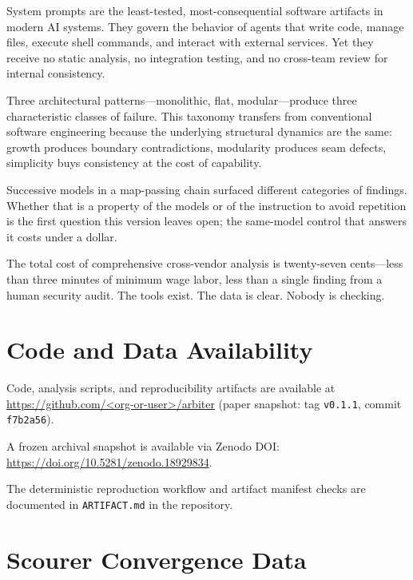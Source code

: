 \documentclass[11pt,a4paper]{article}
\begin{document}
System prompts are the least-tested, most-consequential software
artifacts in modern AI systems. They govern the behavior of agents that
write code, manage files, execute shell commands, and interact with
external services. Yet they receive no static analysis, no integration
testing, and no cross-team review for internal consistency.

Three architectural patterns---monolithic, flat, modular---produce
three characteristic classes of failure. This taxonomy transfers from
conventional software engineering because the underlying structural
dynamics are the same: growth produces boundary contradictions,
modularity produces seam defects, simplicity buys consistency at the
cost of capability.

Successive models in a map-passing chain surfaced different categories
of findings. Whether that is a property of the models or of the
instruction to avoid repetition is the first question this version
leaves open; the same-model control that answers it costs under a
dollar.

The total cost of comprehensive cross-vendor analysis is twenty-seven
cents---less than three minutes of minimum wage labor, less than a
single finding from a human security audit. The tools exist. The data
is clear. Nobody is checking.


\section{Code and Data Availability}
\label{sec:availability}

Code, analysis scripts, and reproducibility artifacts are available at
\url{https://github.com/<org-or-user>/arbiter} (paper snapshot:
tag \texttt{v0.1.1}, commit \texttt{f7b2a56}).

A frozen archival snapshot is available via Zenodo DOI:
\url{https://doi.org/10.5281/zenodo.18929834}.

The deterministic reproduction workflow and artifact manifest checks are
documented in \texttt{ARTIFACT.md} in the repository.





\appendix

\section{Scourer Convergence Data}
\label{app:convergence}
\end{document}
